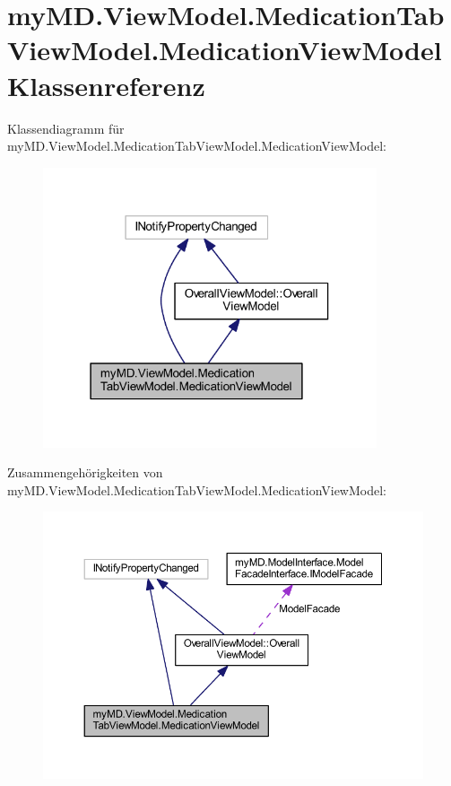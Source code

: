 \hypertarget{classmy_m_d_1_1_view_model_1_1_medication_tab_view_model_1_1_medication_view_model}{}\section{my\+M\+D.\+View\+Model.\+Medication\+Tab\+View\+Model.\+Medication\+View\+Model Klassenreferenz}
\label{classmy_m_d_1_1_view_model_1_1_medication_tab_view_model_1_1_medication_view_model}


Klassendiagramm für my\+M\+D.\+View\+Model.\+Medication\+Tab\+View\+Model.\+Medication\+View\+Model\+:
\nopagebreak
\begin{figure}[H]
\begin{center}
\leavevmode
\includegraphics[width=279pt]{classmy_m_d_1_1_view_model_1_1_medication_tab_view_model_1_1_medication_view_model__inherit__graph}
\end{center}
\end{figure}


Zusammengehörigkeiten von my\+M\+D.\+View\+Model.\+Medication\+Tab\+View\+Model.\+Medication\+View\+Model\+:
\nopagebreak
\begin{figure}[H]
\begin{center}
\leavevmode
\includegraphics[width=350pt]{classmy_m_d_1_1_view_model_1_1_medication_tab_view_model_1_1_medication_view_model__coll__graph}
\end{center}
\end{figure}
